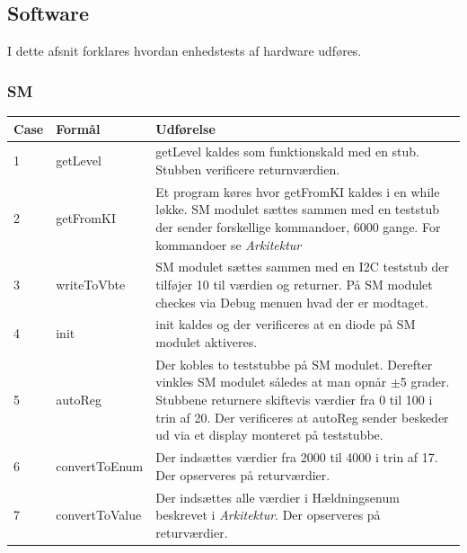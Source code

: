 \subsection{Software}
I dette afsnit forklares hvordan enhedstests af hardware udføres.
\subsubsection{SM}
\begin{table}[H]
\centering
\begin{tabular}{| p{1cm}  | p{4.5cm} | p{8cm} |}
\hline
Case &Formål &Udførelse\\\hline
1 &getLevel &getLevel kaldes som funktionskald med en stub. Stubben verificere returnværdien.\\\hline
2 &getFromKI &Et program køres hvor getFromKI kaldes i en while løkke. SM modulet sættes sammen med en teststub der sender forskellige kommandoer, 6000 gange. For kommandoer se \textit{Arkitektur}\\\hline
3 &writeToVbte &SM modulet sættes sammen med en I2C teststub der tilføjer 10 til værdien og returner. På SM modulet checkes via Debug menuen hvad der er modtaget.\\\hline
4 &init &init kaldes og der verificeres at en diode på SM modulet aktiveres.\\\hline
5 &autoReg &Der kobles to teststubbe på SM modulet. Derefter vinkles SM modulet således at man opnår $\pm$5 grader. Stubbene returnere skiftevis værdier fra 0 til 100 i trin af 20. Der verificeres at autoReg sender beskeder ud via et display monteret på teststubbe.\\\hline
6 &convertToEnum &Der indsættes værdier fra 2000 til 4000 i trin af 17. Der opserveres på returværdier. \\\hline
7 &convertToValue &Der indsættes alle værdier i Hældningsenum beskrevet i \textit{Arkitektur}. Der opserveres på returværdier.\\\hline
\end{tabular}
\end{table}
